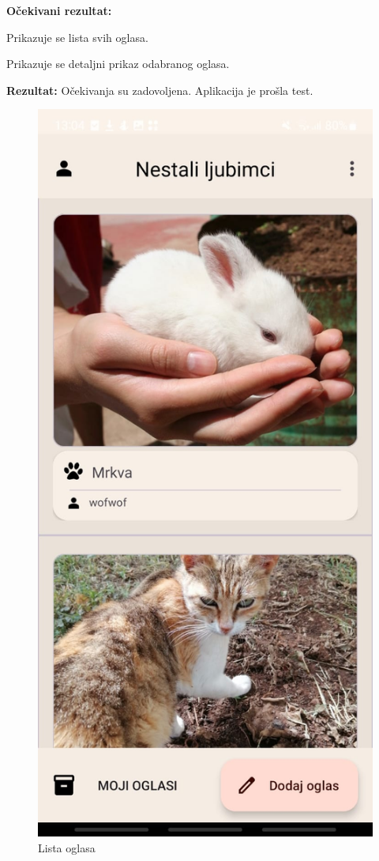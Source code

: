 			\noindent \textbf{Očekivani rezultat: }
			\begin{packed_enum}
				\item	 Prikazuje se lista svih oglasa.
				\item Prikazuje se detaljni prikaz odabranog oglasa.
			\end{packed_enum}

			\noindent \textbf{Rezultat:} Očekivanja su zadovoljena. Aplikacija je prošla test.

			\begin{figure}[H]
			\centering
			\begin{minipage}{.5\textwidth}
	 			 \centering
				  \includegraphics[width=.58\linewidth]{slike/app3v1.jpg}
				  \caption{Lista oglasa}
				  \label{fig:app3v1}
			\end{minipage}%
			\begin{minipage}{.5\textwidth}
				  \centering

\end{minipage}
\end{figure}
